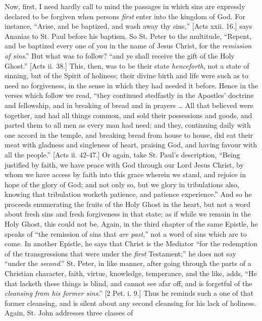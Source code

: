 Now, first, I need hardly call to mind the passages in which sins
are expressly declared to be forgiven when persons \emph{first} enter into
the kingdom of God. For instance, ``Arise, and be baptized, and
wash away thy sins,'' [Acts xxii. 16.] says Ananias to St. Paul
before his baptism. So St. Peter to the multitude, ``Repent, and
be baptized every one of you in the name of Jesus Christ, for the \emph{remission
of sins}.'' But what was to follow? ``and ye shall receive
the gift of the Holy Ghost.'' [Acts ii. 38.] This, then, was to be
their state \emph{henceforth}, not a state of sinning, but of the
Spirit of holiness; their divine birth and life were such as to need
no forgiveness, in the sense in which they had needed it before. Hence
in the verses which follow we read, ``they continued stedfastly in
the Apostles' doctrine and fellowship, and in breaking of bread and in
prayers … All that believed were together, and had all things
common, and sold their possessions and goods, and parted them to all
men as every man had need; and they, continuing daily with one accord
in the temple, and breaking bread from house to house, did eat their
meat with gladness and singleness of heart, praising God, and having
favour with all the people.'' [Acts ii. 42-47.] Or again, take St.
Paul's description, ``Being justified by faith, we have peace with
God through our Lord Jesus Christ, by whom we have access by faith
into this grace wherein we stand, and rejoice in hope of the glory of
God; and not only so, but we glory in tribulations also, knowing that
tribulation worketh patience, and patience experience.'' And so he
proceeds enumerating the fruits of the Holy Ghost in the heart, but
not a word about fresh sins and fresh forgiveness in that state; as if
while we remain in the Holy Ghost, this could not be. Again, in the
third chapter of the same Epistle, he speaks of ``the remission of
sins that \emph{are past},'' not a word of sins which are to come.
In another Epistle, he says that Christ is the Mediator ``for the
redemption of the transgressions that were under the \emph{first}
Testament;'' he does not say ``under the \emph{second}.''
St. Peter, in like manner, after going through the parts of a
Christian character, faith, virtue, knowledge, temperance, and the
like, adds, ``He that lacketh these things is blind, and cannot
see afar off, and is forgetful of the \emph{cleansing from his former
sins}.'' [2 Pet. i. 9.] Thus he reminds such a one of that
former cleansing, and is silent about any second cleansing for his
lack of holiness. Again, St. John addresses three classes of
